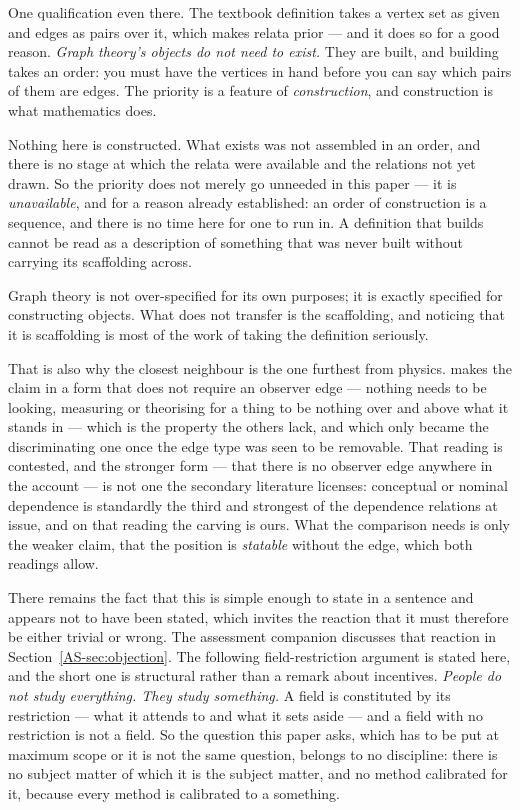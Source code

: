 \documentclass[11pt,a4paper]{article}
\theoremstyle{remark}\newtheorem{remark}[proposition]{Remark}
\begin{document}
One qualification even there. The textbook definition takes
a vertex set as given and edges as pairs over it, which makes relata prior --- and it does so for a good
reason. \emph{Graph theory's objects do not need to exist.} They are built, and building takes an order:
you must have the vertices in hand before you can say which pairs of them are edges. The priority is a
feature of \emph{construction}, and construction is what mathematics does.

Nothing here is constructed. What exists was not assembled in an order, and there is no stage at which
the relata were available and the relations not yet drawn. So the priority does not merely go unneeded
in this paper --- it is \emph{unavailable}, and for a reason already established: an order of
construction is a sequence, and there is no time here for one to run in. A definition that builds cannot
be read as a description of something that was never built without carrying its scaffolding across.

Graph theory is not over-specified for its
own purposes; it is exactly specified for constructing objects. What does not transfer is the
scaffolding, and noticing that it is scaffolding is most of the work of taking the definition
seriously.

That is also why the closest neighbour is the one furthest from physics. \citet{nagarjuna1995} makes the
claim in a form that does not require an observer edge --- nothing needs to be looking, measuring or
theorising for a thing to be nothing over and above what it stands in --- which is the property the
others lack, and which only became the discriminating one once the edge type was seen to be removable.
That reading is contested, and the stronger form --- that there is no observer edge anywhere in the
account --- is not one the secondary literature licenses: conceptual or nominal dependence
is standardly the third and strongest of the dependence relations at issue, and on that reading the
carving is ours. What the comparison needs is only the weaker claim, that the position is
\emph{statable} without the edge, which both readings allow.

There remains the fact that this is simple enough to state in a sentence and appears not to have been
stated, which invites the reaction that it must therefore be either trivial or wrong. The assessment companion discusses that reaction in Section~\ref{AS-sec:objection}. The following field-restriction argument is stated here, and the short one
is structural rather than a remark about incentives. \emph{People do not study everything. They study
something.} A field is constituted by its restriction --- what it attends to and what it sets aside ---
and a field with no restriction is not a field. So the question this paper asks, which has to be put at
maximum scope or it is not the same question, belongs to no discipline: there is no subject matter of
which it is the subject matter, and no method calibrated for it, because every method is calibrated to
a something.
\end{document}
